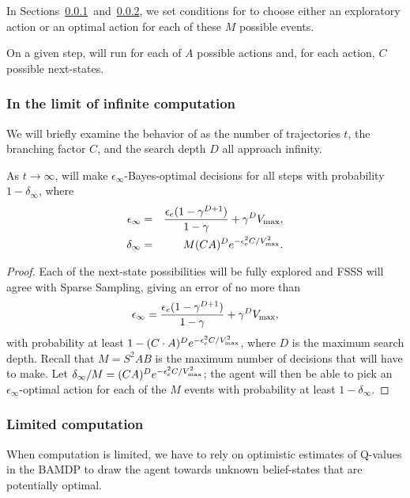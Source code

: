 In Sections~\ref{sec:inf}~and~\ref{sec:fin}, we set conditions for  to choose either an exploratory action or an optimal action for each of these $M$ possible events.

On a given step,  will run  for each of $A$ possible actions and, for each action, $C$ possible next-states.


\subsubsection{In the limit of infinite computation}
\label{sec:inf}

We will briefly examine the behavior of  as the number of trajectories $t$, the branching factor $C$, and the search depth $D$ all approach infinity.

\begin{lemma}
As $t\rightarrow \infty$,  will make $\epsilon_\infty$-Bayes-optimal decisions for all steps with probability $1-\delta_\infty$, where
\begin{eqnarray}
\epsilon_\infty &=& \frac {\epsilon_e(1-\gamma^{D+1})} {1-\gamma}+\gamma^DV_{\rm max},\\
\delta_\infty &=& M(CA)^D e^{-\epsilon_e^2C/V_{\rm max}^2}.
\end{eqnarray}
\end{lemma}
\begin{proof}
Each of the next-state possibilities will be fully explored and FSSS will agree with Sparse Sampling, giving an error of no more than 
$$\epsilon_\infty = \frac {\epsilon_e(1-\gamma^{D+1})} {1-\gamma}+\gamma^DV_{\rm max},$$
with probability at least $1-(C\cdot A)^D e^{-\epsilon_e^2C/V_{\rm max}^2}$, where $D$ is the maximum search depth. Recall that $M = S^2 A B$ is the maximum number of decisions that  will have to make. Let $\delta_\infty/M=(C A)^De^{-\epsilon_e^2C/V_{\rm max}^2}$; the agent will then be able to pick an $\epsilon_\infty$-optimal action for each of the $M$ events with probability  at least $1-\delta_\infty$.
\end{proof}


\subsubsection{Limited computation}
\label{sec:fin}

When computation is limited, we have to rely on optimistic estimates of Q-values in the BAMDP to draw the agent towards unknown belief-states that are potentially optimal.

